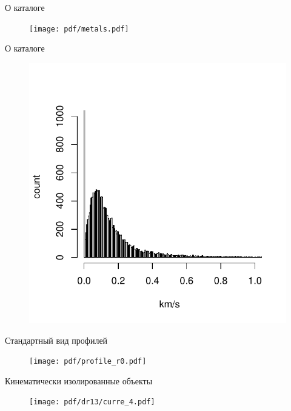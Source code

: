 \documentclass{beamer}
\begin{document}
\begin{frame}{О каталоге}
	\begin{center}
	\begin{figure}[h]
\begin{minipage}[h]{0.8\linewidth}
\texttt{[image: pdf/metals.pdf]}
\end{minipage}
\end{figure}
	\end{center}
\end{frame}

\begin{frame}{О каталоге}
	\begin{center}
	\begin{figure}[h]
\begin{minipage}[h]{0.7\linewidth}
\includegraphics[width=1\linewidth]{pdf/vscatter.pdf}
\end{minipage}
\end{figure}
	\end{center}
\end{frame}

\begin{frame}{Стандартный вид профилей}
	\begin{center}
	\begin{figure}[h]
\begin{minipage}[h]{0.8\linewidth}
\texttt{[image: pdf/profile\_r0.pdf]}
\end{minipage}
\end{figure}
	\end{center}
\end{frame}

\begin{frame}{Кинематически изолированные объекты}
	\begin{center}
	\begin{figure}[h]
\begin{minipage}[h]{0.8\linewidth}
\texttt{[image: pdf/dr13/curre\_4.pdf]}
\end{minipage}
\end{figure}
	\end{center}
\end{frame}
\end{document}
